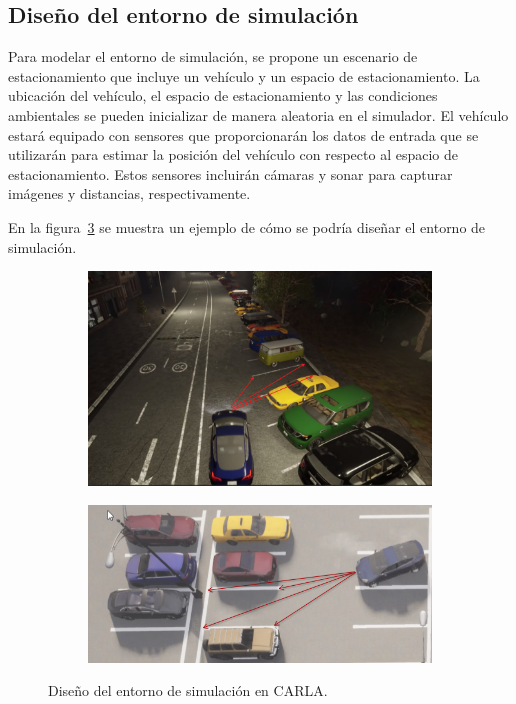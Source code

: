 \subsection{Diseño del entorno de simulación}\label{subsec:simulation-design}

Para modelar el entorno de simulación, se propone un escenario de estacionamiento que incluye un vehículo y un espacio de estacionamiento.
La ubicación del vehículo, el espacio de estacionamiento y las condiciones ambientales se pueden inicializar de manera aleatoria en el simulador.
El vehículo estará equipado con sensores que proporcionarán los datos de entrada que se utilizarán para estimar la posición del vehículo con respecto al espacio de estacionamiento.
Estos sensores incluirán cámaras y sonar para capturar imágenes y distancias, respectivamente.

En la figura~\ref{fig:simulation-design} se muestra un ejemplo de cómo se podría diseñar el entorno de simulación.

\begin{figure}[!ht]
    \centering
    \begin{subfigure}{0.4\textwidth}
        \includegraphics[width=\textwidth]{img/distances}\label {fig:distances}
    \end{subfigure}
    \begin{subfigure}{0.4\textwidth}
        \includegraphics[width=\textwidth]{img/distances2}\label {fig:distances2}
    \end{subfigure}
    
    \caption{Diseño del entorno de simulación en CARLA.}
    \label{fig:simulation-design}
\end{figure}

